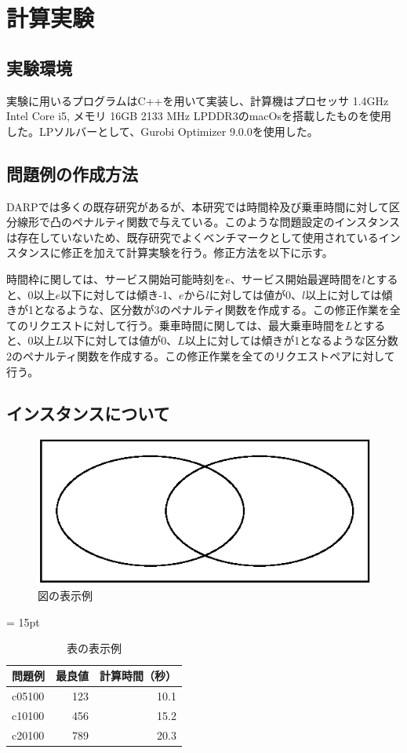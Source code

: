 \chapter{計算実験}\label{computational_result}
\section{実験環境}
実験に用いるプログラムはC++を用いて実装し、計算機はプロセッサ 1.4GHz Intel Core i5, メモリ 16GB 2133 MHz LPDDR3のmacOsを搭載したものを使用した。LPソルバーとして、Gurobi Optimizer 9.0.0を使用した。
\section{問題例の作成方法}
DARPでは多くの既存研究があるが、本研究では時間枠及び乗車時間に対して区分線形で凸のペナルティ関数で与えている。このような問題設定のインスタンスは存在していないため、既存研究でよくベンチマークとして使用されているインスタンスに修正を加えて計算実験を行う。修正方法を以下に示す。

時間枠に関しては、サービス開始可能時刻を$e$、サービス開始最遅時間を$l$とすると、0以上$e$以下に対しては傾き-1、$e$から$l$に対しては値が0、$l$以上に対しては傾きが1となるような、区分数が3のペナルティ関数を作成する。この修正作業を全てのリクエストに対して行う。乗車時間に関しては、最大乗車時間を$L$とすると、0以上$L$以下に対しては値が0、$L$以上に対しては傾きが1となるような区分数2のペナルティ関数を作成する。この修正作業を全てのリクエストペアに対して行う。

\section{インスタンスについて}


\begin{figure}[htbp]
 \centering
 \includegraphics[width=0.9\linewidth]{sample_fig.eps}
 \caption{図の表示例}
 \label{fig1}
\end{figure}

\begin{table}[htbp]
 \centering
 \tabcolsep = 15pt
 \renewcommand{\arraystretch}{0.8}
 \caption{表の表示例}
 \label{table1}
 \begin{tabular}{lrr} \hline
  問題例 & 最良値 & 計算時間（秒） \\ \hline
  c05100 &    123 & 10.1 \\
  c10100 &    456 & 15.2 \\
  c20100 &    789 & 20.3 \\ \hline
 \end{tabular}
\end{table}


